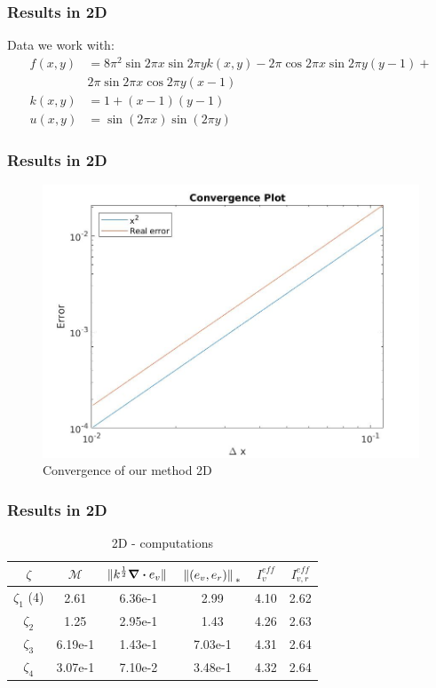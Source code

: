 \documentclass[t]{beamer}
\begin{document}
\begin{frame}[c]
\frametitle{Results in 2D}
Data we work with:
\begin{align*}
f(x,y) &= 8\pi^2\sin{2\pi x}\sin{2\pi y}k(x,y) - 2\pi\cos{2\pi x}\sin{2\pi y}(y-1)+ \\ &2\pi\sin{2\pi x}\cos{2\pi y}(x-1) \\
k(x,y) &= 1 + (x-1)(y-1) \\
u(x,y) &= \sin(2\pi x)\sin(2\pi y)
\end{align*}


\end{frame}
\begin{frame}
\frametitle{Results in 2D}
\begin{figure}
\centering
\includegraphics[width = 0.7\linewidth]{../../Images/convergence2d.jpg}
\caption{Convergence of our method 2D}
\end{figure}
\end{frame}

\begin{frame}[c]
\frametitle{Results in 2D}
\begin{table}[c]
\begin{tabular}{c | c | c | c | c | c } 
$\zeta$ & $\mathcal{M}$  & $\norm*{k^{\frac{1}{2}}\div e_v}$ & $\norm*{(e_v,e_r)}_{*}$ & $I_v^{eff}$ & $I_{v,r}^{eff}$ \\
\hline \hline
$\zeta_1$ (4) & 2.61 & 6.36e-1 & 2.99 & 4.10 & 2.62 \\ 
$\zeta_2$ & 1.25 & 2.95e-1 & 1.43 & 4.26 & 2.63 \\
$\zeta_3$ & 6.19e-1 & 1.43e-1& 7.03e-1 & 4.31 & 2.64 \\
$\zeta_4$ & 3.07e-1 & 7.10e-2 & 3.48e-1 & 4.32 & 2.64 \\
\end{tabular}
\caption{2D - computations}
\end{table}

\end{frame}
\end{document}
